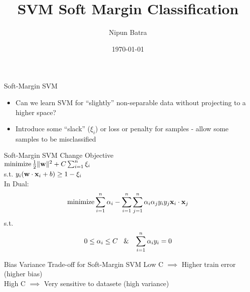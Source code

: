 \documentclass{beamer}
\title{SVM Soft Margin Classification}
\date{\today}
\author{Nipun Batra}
\institute{IIT Gandhinagar}
\begin{document}
	\maketitle
	
{
	
}

	
	\begin{frame}{Soft-Margin SVM}
	\begin{itemize}[<+->]
		\item Can we learn SVM for ``slightly'' non-separable data without projecting to a higher space? 
		\item Introduce some ``slack'' ($\xi_i$) or loss or penalty for samples - allow some samples to be misclassified
		
	\end{itemize}
		
		
		
	\end{frame}

{
	
}
	
	\begin{frame}{Soft-Margin SVM}
		Change Objective \\
		\vspace{0.1cm}
		$\operatorname{minimize} \frac{1}{2}\|\mathbf{w}\|^{2} + C \sum_{i=1}^{n}\xi_{i}$ \\ s.t. $y_{i}(\mathbf{w} \cdot \mathbf{x}_i + b) \geq 1 - \xi_{i}$ \\
		
		\vspace{0.2cm}
		\pause In Dual:
		$$\operatorname{minimize} \sum_{i=1}^{n}\alpha_{i} - \sum_{i=1}^{n}\sum_{j=1}^{n}\alpha_{i}\alpha_{j}y_{i}y_{j}\mathbf{x}_{i} \cdot \mathbf{x}_{j}$$
		s.t.
		$$0 \leq \alpha_{i} \leq C \text{\hspace{0.3cm}\&\hspace{0.3cm}} \sum_{i=1}^{n}\alpha_{i}y_{i} = 0$$
		
	\end{frame}


{
	
}

\begin{frame}{Bias Variance Trade-off for Soft-Margin SVM}
	Low C $\implies$ Higher train error (higher bias) \\
	\vspace{1cm}
	High C $\implies$ Very sensitive to datasete (high variance) \\
\end{frame}
\end{document}
